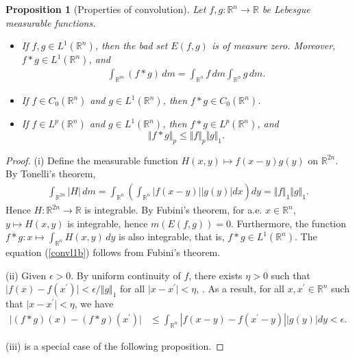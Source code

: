 \documentclass{article}
\numberwithin{equation}{section}
\newcommand{\bbR}{\mathbb{R}}
\theoremstyle{plain}
\newtheorem{proposition}[theorem]{Proposition}
\theoremstyle{definition}
\begin{document}
\begin{proposition}[Properties of convolution]\label{prop:1.2}
Let $f,g:\mathbb{R}^n\to\mathbb{R}$ be Lebesgue measurable functions.
\begin{itemize}
	\item[(i)] If $f,g\in L^1(\mathbb{R}^n)$, then the bad set $E(f,g)$ is of measure zero. Moreover, $f*g\in L^1(\mathbb{R}^n)$, and
	\begin{align}
		\int_{\bbR^m} (f*g)\,dm = \int_{\bbR^n}f\,dm\int_{\bbR^n}g\,dm.\label{convl1b}
	\end{align}
	\item[(ii)] If $f\in C_0(\mathbb{R}^n)$ and $g\in L^1(\mathbb{R}^n)$, then $f*g\in C_0(\mathbb{R}^n)$.
	\item[(iii)] If $f\in L^p(\bbR^n)$ and $g\in L^1(\bbR^n)$, then $f*g\in L^p(\bbR^n)$, and $$\Vert f*g\Vert_p\leq\Vert f\Vert_p\Vert g\Vert_1.$$
\end{itemize}
\end{proposition}
\begin{proof}
	(i) Define the measurable function $H(x,y)\mapsto f(x-y)g(y)$ on $\mathbb{R}^{2n}$. By Tonelli's theorem, 
	\begin{align*}
		\int_{\mathbb{R}^{2n}}\vert H\vert\,dm = \int_{\bbR^n}\left(\int_{\bbR^n} \left\vert f(x-y)\right\vert\left\vert g(y)\right\vert dx\right)dy = \Vert f\Vert_1\Vert g\Vert_1.
	\end{align*}
	Hence $H:\mathbb{R}^{2n}\to\mathbb{R}$ is integrable. By Fubini's theorem, for a.e. $x\in\mathbb{R}^n$, $y\mapsto H(x,y)$ is integrable, hence $m(E(f,g))=0$. Furthermore, the function $f*g:x\mapsto \int_{\bbR^n}H(x,y)\,dy$ is also integrable, that is, $f*g\in L^1(\mathbb{R}^n)$. The equation (\ref{convl1b}) follows from Fubini's theorem.
	\vspace{0.1cm}
	
	(ii) Given $\epsilon>0$. By uniform continuity of $f$, there exists $\eta > 0$ such that $\vert f(x) - f(x^\prime)\vert < \epsilon/\Vert g\Vert_1$ for all $\vert x-x^\prime\vert < \eta$, . As a result, for all $x,x^\prime\in\mathbb{R}^n$ such that $\vert x-x^\prime\vert < \eta$, we have
	\begin{align*}
		\vert(f*g)(x) - (f*g)(x^\prime)\vert
		&\leq \int_{\bbR^n} \left\vert f(x-y) - f(x^\prime-y)\right\vert \left\vert g(y)\right\vert dy < \epsilon.
	\end{align*}

(iii) is a special case of the following proposition.
\end{proof}
\end{document}

